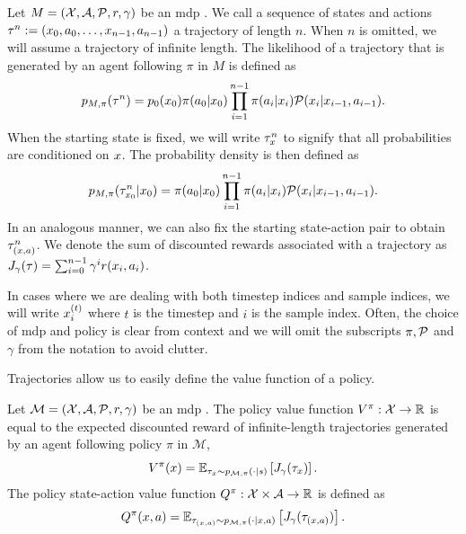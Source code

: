 \begin{definition}[Trajectories]
    Let $M = (\states,\actions,\mathcal{P},r,\gamma)$ be an \ac{mdp}  .
    We call a sequence of states and actions $\tau^n := (\state_0,a_0,\dots,\state_{n-1},a_{n-1})$ a trajectory of length $n$.
    When $n$ is omitted, we will assume a trajectory of infinite length.
    The likelihood of a trajectory that is generated by an agent following $\pi$ in $M$ is defined as $$p_{M, \pi}(\tau^n) = p_0(\state_0) \pi(a_0|\state_0) \prod_{i=1}^{n-1} \pi(a_i|\state_i) \mathcal{P}(\state_i|\state_{i-1},a_{i-1}).$$
    When the starting state is fixed, we will write $\tau^n_\state$ to signify that all probabilities are conditioned on $\state$. 
    The probability density is then defined as $$p_{M,\pi}(\tau^n_{\state_0}|\state_0) = \pi(a_0|\state_0) \prod_{i=1}^{n-1} \pi(a_i|\state_i) \mathcal{P}(\state_i|\state_{i-1},a_{i-1}).$$
    In an analogous manner, we can also fix the starting state-action pair to obtain $\tau^n_{(\state,a)}$.
    We denote the sum of discounted rewards associated with a trajectory as $J_\gamma(\tau) = \sum_{i=0}^{n-1} \gamma^i r(\state_i,a_i)$.
\end{definition}

In cases where we are dealing with both timestep indices and sample indices, we will write $\state^{(t)}_i$ where $t$ is the timestep and $i$ is the sample index.
Often, the choice of \ac{mdp}  and policy is clear from context and we will omit the subscripts $\pi,\P$ and $\gamma$ from the notation to avoid clutter.

Trajectories allow us to easily define the value function of a policy.

\begin{definition}
    Let $\mathcal{M} = (\states,\actions,\mathcal{P},r,\gamma)$ be an \ac{mdp}  .
    The policy value function $V^\pi: \states \rightarrow \mathbb{R}$ is equal to the expected discounted reward of infinite-length trajectories generated by an agent following policy $\pi$ in $\mathcal{M}$, $$V^\pi(\state) = \mathbb{E}_{\tau_\state \sim p_{\mathcal{M},\pi}(\cdot|s)} \left[ J_\gamma(\tau_\state)\right].$$
    The policy state-action value function $Q^\pi: \states \times \actions \rightarrow \mathbb{R}$ is defined as $$Q^\pi(\state,a) = \mathbb{E}_{\tau_{(\state,a)} \sim p_{\mathcal{M},\pi}(\cdot|\state,a)} \left[ J_\gamma(\tau_{(\state,a)})\right].$$
\end{definition}

